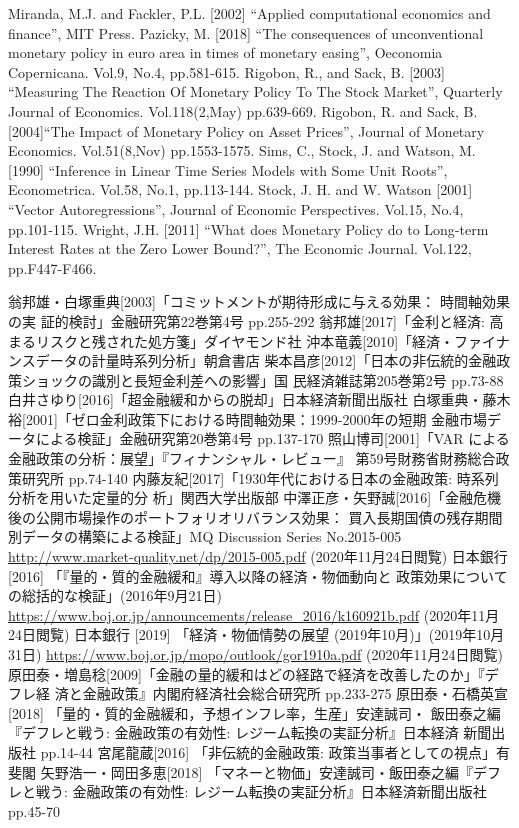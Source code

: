 \documentclass[12pt]{article}
\begin{document}
\begin{thebibliography}{99}
    \bibitem{} Miranda, M.J. and Fackler, P.L. [2002] “Applied computational economics and
    finance”, MIT Press.
    \bibitem{} Pazicky, M. [2018] “The consequences of unconventional monetary policy in euro
    area in times of monetary easing”, Oeconomia Copernicana. Vol.9, No.4, pp.581-615.
    \bibitem{} Rigobon, R., and Sack, B. [2003] “Measuring The Reaction Of Monetary Policy To
    The Stock Market”, Quarterly Journal of Economics. Vol.118(2,May) pp.639-669.
    \bibitem{} Rigobon, R. and Sack, B. [2004]“The Impact of Monetary Policy on Asset Prices”,
    Journal of Monetary Economics. Vol.51(8,Nov) pp.1553-1575.
    \bibitem{} Sims, C., Stock, J. and Watson, M. [1990] “Inference in Linear Time Series Models
    with Some Unit Roots”, Econometrica. Vol.58, No.1, pp.113-144.
    \bibitem{} Stock, J. H. and W. Watson [2001] “Vector Autoregressions”, Journal of Economic
    Perspectives. Vol.15, No.4, pp.101-115.
    \bibitem{} Wright, J.H. [2011] “What does Monetary Policy do to Long-term Interest Rates
    at the Zero Lower Bound?”, The Economic Journal. Vol.122, pp.F447-F466.

    \bibitem{}  翁邦雄・白塚重典[2003]「コミットメントが期待形成に与える効果： 時間軸効果の実
    証的検討」金融研究第22巻第4号 pp.255-292
    \bibitem{} 翁邦雄[2017]「金利と経済: 高まるリスクと残された処方箋」ダイヤモンド社
    \bibitem{} 沖本竜義[2010]「経済・ファイナンスデータの計量時系列分析」朝倉書店
    \bibitem{} 柴本昌彦[2012]「日本の非伝統的金融政策ショックの識別と長短金利差への影響」国
    民経済雑誌第205巻第2号 pp.73-88
    \bibitem{} 白井さゆり[2016]「超金融緩和からの脱却」日本経済新聞出版社
    \bibitem{} 白塚重典・藤木裕[2001]「ゼロ金利政策下における時間軸効果：1999-2000年の短期
    金融市場データによる検証」金融研究第20巻第4号 pp.137-170
    \bibitem{} 照山博司[2001]「VAR による金融政策の分析：展望」『フィナンシャル・レビュー』
    第59号財務省財務総合政策研究所 pp.74-140
    \bibitem{} 内藤友紀[2017]「1930年代における日本の金融政策: 時系列分析を用いた定量的分
    析」関西大学出版部
    \bibitem{} 中澤正彦・矢野誠[2016]「金融危機後の公開市場操作のポートフォリオリバランス効果：
    買入長期国債の残存期間別データの構築による検証」MQ Discussion Series No.2015-005
    \url{http://www.market-quality.net/dp/2015-005.pdf} (2020年11月24日閲覧)
    \bibitem{} 日本銀行 [2016] 「『量的・質的金融緩和』導入以降の経済・物価動向と
    政策効果についての総括的な検証」(2016年9月21日) \url{https://www.boj.or.jp/announcements/release_2016/k160921b.pdf} (2020年11月24日閲覧)
    \bibitem{} 日本銀行 [2019] 「経済・物価情勢の展望 (2019年10月)」(2019年10月31日) \url{https://www.boj.or.jp/mopo/outlook/gor1910a.pdf} (2020年11月24日閲覧)
    \bibitem{} 原田泰・増島稔[2009]「金融の量的緩和はどの経路で経済を改善したのか」『デフレ経
    済と金融政策』内閣府経済社会総合研究所 pp.233-275
    \bibitem{} 原田泰・石橋英宣[2018] 「量的・質的金融緩和，予想インフレ率，生産」安達誠司・
    飯田泰之編『デフレと戦う: 金融政策の有効性: レジーム転換の実証分析』日本経済
    新聞出版社 pp.14-44
    \bibitem{} 宮尾龍蔵[2016] 「非伝統的金融政策: 政策当事者としての視点」有斐閣
    \bibitem{} 矢野浩一・岡田多恵[2018] 「マネーと物価」安達誠司・飯田泰之編『デフレと戦う:
    金融政策の有効性: レジーム転換の実証分析』日本経済新聞出版社 pp.45-70
    
\end{thebibliography}
\end{document}
